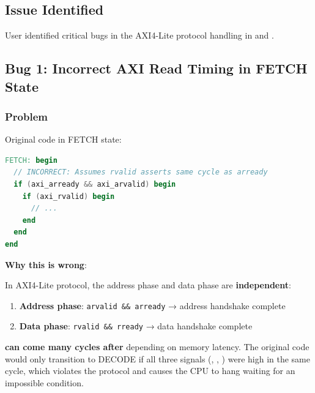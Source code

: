\subsection{Issue Identified}\label{cr:fix:critical-fixes:issue-identified}

\begin{record}

User identified critical bugs in the AXI4-Lite protocol handling in
 and .

\end{record}

\subsection{Bug 1: Incorrect AXI Read Timing in FETCH State}\label{cr:fix:critical-fixes:bug-1-incorrect-axi-read-timing-in-fetch-state}

\subsubsection{Problem}\label{cr:fix:critical-fixes:problem}

\begin{record}

Original code in  FETCH state:

\begin{lstlisting}[language=Verilog]
FETCH: begin
  // INCORRECT: Assumes rvalid asserts same cycle as arready
  if (axi_arready && axi_arvalid) begin
    if (axi_rvalid) begin
      // ...
    end
  end
end
\end{lstlisting}

\textbf{Why this is wrong}:

In AXI4-Lite protocol, the address phase and data phase are
\textbf{independent}:

\begin{enumerate}
\def\labelenumi{\arabic{enumi}.}
\tightlist
\item
  \textbf{Address phase}: \texttt{arvalid\ \&\&\ arready} → address
  handshake complete
\item
  \textbf{Data phase}: \texttt{rvalid\ \&\&\ rready} → data handshake
  complete
\end{enumerate}

\textbf{ can come many cycles after }
depending on memory latency. The original code would only transition to
DECODE if all three signals (, ,
) were high in the same cycle, which violates the protocol
and causes the CPU to hang waiting for an impossible condition.

\end{record}


